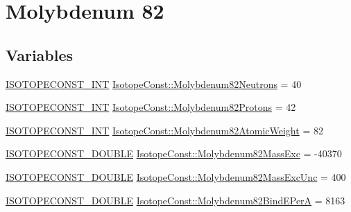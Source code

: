 \hypertarget{group___isotope_const-_molybdenum-_mo82}{}\section{Molybdenum 82}
\label{group___isotope_const-_molybdenum-_mo82}
\subsection*{Variables}
\begin{DoxyCompactItemize}
\item 
\mbox{\hyperlink{group___isotope_const-_macros_ga5f18360b3e99483a35c32d789e62621c}{I\+S\+O\+T\+O\+P\+E\+C\+O\+N\+S\+T\+\_\+\+I\+NT}} \mbox{\hyperlink{group___isotope_const-_molybdenum-_mo82_ga9dfedef9370605e90589333b7ccbfbd6}{Isotope\+Const\+::\+Molybdenum82\+Neutrons}} = 40
\item 
\mbox{\hyperlink{group___isotope_const-_macros_ga5f18360b3e99483a35c32d789e62621c}{I\+S\+O\+T\+O\+P\+E\+C\+O\+N\+S\+T\+\_\+\+I\+NT}} \mbox{\hyperlink{group___isotope_const-_molybdenum-_mo82_ga88934ad6e61d07debfab4287ae3403b1}{Isotope\+Const\+::\+Molybdenum82\+Protons}} = 42
\item 
\mbox{\hyperlink{group___isotope_const-_macros_ga5f18360b3e99483a35c32d789e62621c}{I\+S\+O\+T\+O\+P\+E\+C\+O\+N\+S\+T\+\_\+\+I\+NT}} \mbox{\hyperlink{group___isotope_const-_molybdenum-_mo82_ga0bcaa908b7c70326ea04f91401ee0ee6}{Isotope\+Const\+::\+Molybdenum82\+Atomic\+Weight}} = 82
\item 
\mbox{\hyperlink{group___isotope_const-_macros_ga8f45a7272ce02c0b4c65c44636ed719a}{I\+S\+O\+T\+O\+P\+E\+C\+O\+N\+S\+T\+\_\+\+D\+O\+U\+B\+LE}} \mbox{\hyperlink{group___isotope_const-_molybdenum-_mo82_ga07f6bf9e1e1f71390b3bd91985a25be0}{Isotope\+Const\+::\+Molybdenum82\+Mass\+Exc}} = -\/40370
\item 
\mbox{\hyperlink{group___isotope_const-_macros_ga8f45a7272ce02c0b4c65c44636ed719a}{I\+S\+O\+T\+O\+P\+E\+C\+O\+N\+S\+T\+\_\+\+D\+O\+U\+B\+LE}} \mbox{\hyperlink{group___isotope_const-_molybdenum-_mo82_gaa91f6dba1a531299402f4fd6fe561df0}{Isotope\+Const\+::\+Molybdenum82\+Mass\+Exc\+Unc}} = 400
\item 
\mbox{\hyperlink{group___isotope_const-_macros_ga8f45a7272ce02c0b4c65c44636ed719a}{I\+S\+O\+T\+O\+P\+E\+C\+O\+N\+S\+T\+\_\+\+D\+O\+U\+B\+LE}} \mbox{\hyperlink{group___isotope_const-_molybdenum-_mo82_gaec850c7c70b5ef89c444b4674f6a7293}{Isotope\+Const\+::\+Molybdenum82\+Bind\+E\+PerA}} = 8163
\item 

\end{DoxyCompactItemize}
